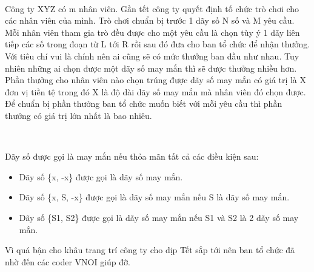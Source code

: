  

Công ty XYZ có m nhân viên. Gần tết công ty quyết định tố chức trò chơi cho các nhân viên của mình. Trò chơi chuẩn bị trước 1 dãy số N số và M yêu cầu. Mỗi nhân viên tham gia trò đều được cho một yêu cầu là chọn tùy ý 1 dãy liên tiếp các số trong đoạn từ L tới R rồi sau đó đưa cho ban tổ chức để nhận thưởng. Với tiêu chí vui là chính nên ai cũng sẽ có mức thưởng ban đầu như nhau. Tuy nhiên những ai chọn được một dãy số may mắn thì sẽ được thưởng nhiều hơn. Phần thưởng cho nhân viên nào chọn trúng được dãy số may mắn có giá trị là X đơn vị tiền tệ trong đó X là độ dài dãy số may mắn mà nhân viên đó chọn được. Để chuẩn bị phần thưởng ban tổ chức muốn biết với mỗi yêu cầu thì phần thưởng có giá trị lớn nhất là bao nhiêu.

 

Dãy số được gọi là may mắn nếu thỏa mãn tất cả các điều kiện sau:
\begin{itemize}
	\item 

Dãy số \{x, -x\} được gọi là dãy số may mắn.
\end{itemize}
\begin{itemize}
	\item 

Dãy số \{x, S, -x\} được gọi là dãy số may mắn nếu S là dãy số may mắn.
\end{itemize}
\begin{itemize}
	\item 

Dãy số \{S1, S2\} được gọi là dãy số may mắn nếu S1 và S2 là 2 dãy số may mắn.
\end{itemize}

Vì quá bận cho khâu trang trí công ty cho dịp Tết sắp tới nên ban tổ chức đã nhờ đến các coder VNOI giúp đỡ.